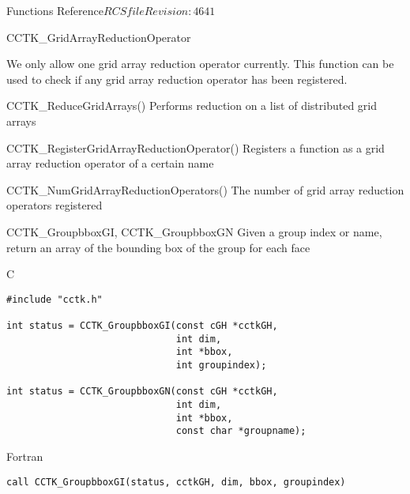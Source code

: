 \begin{cactuspart}{ Functions Reference}{$RCSfile$}{$Revision: 4641 $}
\begin{FunctionDescription}{CCTK\_GridArrayReductionOperator}

\begin{Discussion}
We only allow one grid array reduction operator currently. This function can be used to check if any grid array reduction operator has been registered.
\end{Discussion}

\begin{SeeAlsoSection}
\begin{SeeAlso}{CCTK\_ReduceGridArrays()}
Performs reduction on a list of distributed grid arrays
\end{SeeAlso}

\begin{SeeAlso}{CCTK\_RegisterGridArrayReductionOperator()}
Registers a function as a grid array reduction operator of a certain name
\end{SeeAlso}

\begin{SeeAlso}{CCTK\_NumGridArrayReductionOperators()}
The number of grid array reduction operators registered
\end{SeeAlso}
\end{SeeAlsoSection}
\end{FunctionDescription}


\begin{FunctionDescription}{CCTK\_GroupbboxGI, CCTK\_GroupbboxGN}
\label{CCTK-GroupbboxGI}
\label{CCTK-GroupbboxGN}
Given a group index or name, return an array of the bounding box of the group for each face

\begin{SynopsisSection}
\begin{Synopsis}{C}
\begin{verbatim}
#include "cctk.h"

int status = CCTK_GroupbboxGI(const cGH *cctkGH,
                              int dim,
                              int *bbox,
                              int groupindex);

int status = CCTK_GroupbboxGN(const cGH *cctkGH,
                              int dim,
                              int *bbox,
                              const char *groupname);
\end{verbatim}
\end{Synopsis}
\begin{Synopsis}{Fortran}
\begin{verbatim}
call CCTK_GroupbboxGI(status, cctkGH, dim, bbox, groupindex)


\end{verbatim}
\end{Synopsis}
\end{SynopsisSection}
\end{FunctionDescription}
\end{cactuspart}
